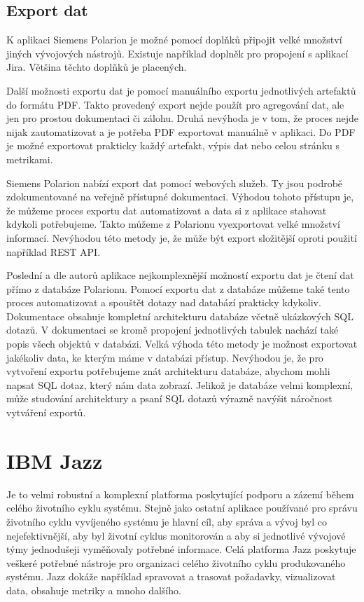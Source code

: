 \documentclass[czech,master]{diploma}
\begin{document}
\subsection{Export dat}
K aplikaci Siemens Polarion je možné pomocí doplňků připojit velké množství jiných vývojových nástrojů. Existuje například doplněk pro propojení s aplikací Jira. Většina těchto doplňků je placených. \cite{ref:polarion_extensions}

Další možnosti exportu dat je pomocí manuálního exportu jednotlivých artefaktů do formátu PDF. Takto provedený export nejde použít pro agregování dat, ale jen pro prostou dokumentaci či zálohu. Druhá nevýhoda je v tom, že proces nejde nijak zautomatizovat a je potřeba PDF exportovat manuálně v aplikaci. Do PDF je možné exportovat prakticky každý artefakt, výpis dat nebo celou stránku s metrikami.

Siemens Polarion nabízí export dat pomocí webových služeb. Ty jsou podrobě zdokumentované na veřejně přístupné dokumentaci. \cite{ref:polarion_documentation} Výhodou tohoto přístupu je, že můžeme proces exportu dat automatizovat a data si z aplikace stahovat kdykoli potřebujeme. Takto můžeme z Polarionu vyexportovat velké množství informací. Nevýhodou této metody je, že může být export složitější oproti použití například REST API.

Poslední a dle autorů aplikace nejkomplexnější možností exportu dat je čtení dat přímo z databáze Polarionu. Pomocí exportu dat z databáze můžeme také tento proces automatizovat a spouštět dotazy nad databází prakticky kdykoliv. Dokumentace obsahuje kompletní architekturu databáze včetně ukázkových SQL dotazů. \cite{ref:polarion_documentation} V dokumentaci se kromě propojení jednotlivých tabulek nachází také popis všech objektů v databázi. Velká výhoda této metody je možnost exportovat jakékoliv data, ke kterým máme v databázi přístup. Nevýhodou je, že pro vytvoření exportu potřebujeme znát architekturu databáze, abychom mohli napsat SQL dotaz, který nám data zobrazí. Jelikož je databáze velmi komplexní, může studování architektury a psaní SQL dotazů výrazně navýšit náročnost vytváření exportů.

\section{IBM Jazz}
Je to velmi robustní a komplexní platforma poskytující podporu a zázemí během celého životního cyklu systému. Stejně jako ostatní aplikace používané pro správu životního cyklu vyvíjeného systému je hlavní cíl, aby správa a vývoj byl co nejefektivnější, aby byl životní cyklus monitorován a aby si jednotlivé vývojové týmy jednodušeji vyměňovaly potřebné informace. Celá platforma Jazz poskytuje veškeré potřebné nástroje pro organizaci celého životního cyklu produkovaného systému. Jazz dokáže například spravovat a trasovat požadavky, vizualizovat data, obsahuje metriky a mnoho dalšího. \cite{ref:jazz}
\end{document}
